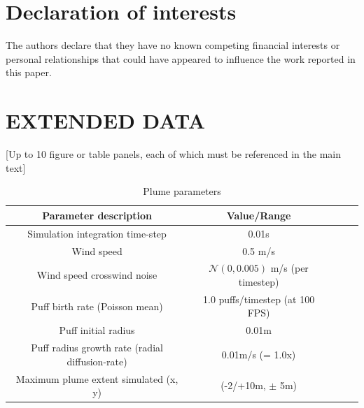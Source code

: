 \documentclass[5p,twocolumn,authoryear]{elsarticle}
\begin{document}
\section*{Declaration of interests}
The authors declare that they have no known competing financial interests or personal relationships that could have appeared to influence the work reported in this paper.



\clearpage
\small
% 
% 
% 




\appendix
\onecolumn

\clearpage
\section{EXTENDED DATA} 
[Up to 10 figure or table panels, each of which must be referenced in the main text]


\begin{table}[h!]
    \centering
    \begin{tabular}{ccccc}
     \hline\hline
     \textbf{Parameter description} & \textbf{Value/Range} \\
     \hline   
       Simulation integration time-step & 0.01s  \\ \hline
       Wind speed & 0.5 m/s  \\  \hline
       Wind speed crosswind noise & $\mathcal{N}(0, 0.005)$ m/s (per timestep)  \\ \hline
       Puff birth rate (Poisson mean) & 1.0 puffs/timestep (at 100 FPS)  \\ \hline
       Puff initial radius & 0.01m  \\ \hline
       Puff radius growth rate (radial diffusion-rate) & 0.01m/s (= 1.0x)  \\ \hline
       Maximum plume extent simulated (x, y) & (-2/+10m, $\pm$ 5m)  \\ \hline
     \hline
    \end{tabular}
    \caption{Plume parameters}
    \label{table_supp_plume}
\end{table}
\end{document}
